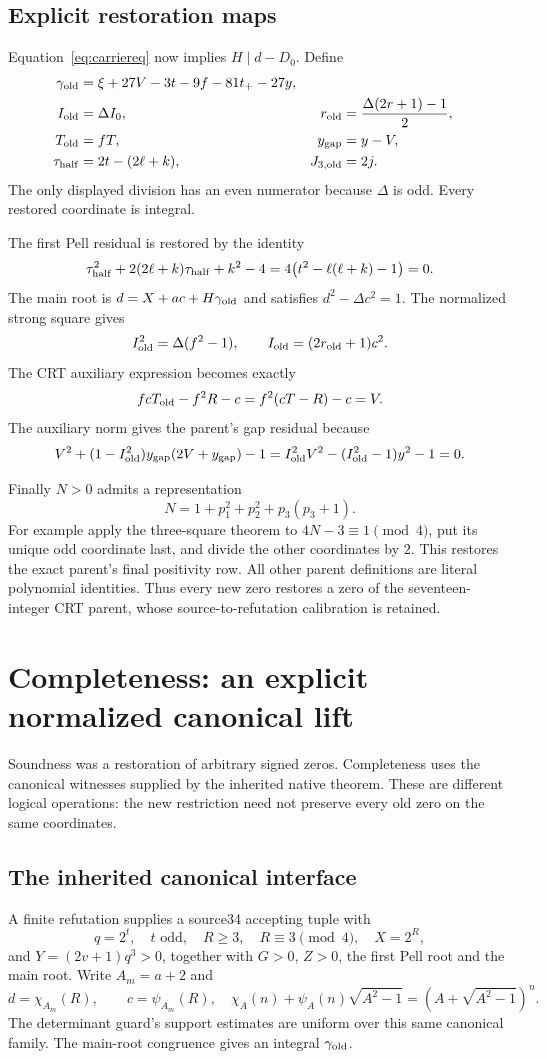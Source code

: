 \documentclass[11pt]{article}
\theoremstyle{remark}\newtheorem{remark}[theorem]{Remark}
\begin{document}
\subsection{Explicit restoration maps}
Equation~\eqref{eq:carriereq} now implies $H\mid d-D_0$. Define
\begin{align}
 \gamma_{\rm old}&=\xi+27V-3t-9f-81t_+-27y,\notag\\
 I_{\rm old}&=\Delta I_0,
 &r_{\rm old}&=\frac{\Delta(2r+1)-1}{2},\label{eq:restore}\\
 T_{\rm old}&=fT,
 &y_{\rm gap}&=y-V,\notag\\
 \tau_{\rm half}&=2t-(2\ell+k),
 &J_{3,\rm old}&=2j.\notag
\end{align}
The only displayed division has an even numerator because $\Delta$ is
odd. Every restored coordinate is integral.

The first Pell residual is restored by the identity
\[
 \tau_{\rm half}^2+2(2\ell+k)\tau_{\rm half}+k^2-4
 =4\bigl(t^2-\ell(\ell+k)-1\bigr)=0.
\]
The main root is $d=X+ac+H\gamma_{\rm old}$ and satisfies
$d^2-\Delta c^2=1$. The normalized strong square gives
\[
 I_{\rm old}^2=\Delta(f^2-1),\qquad
 I_{\rm old}=(2r_{\rm old}+1)c^2.
\]
The CRT auxiliary expression becomes exactly
\[
 fcT_{\rm old}-f^2R-c=f^2(cT-R)-c=V.
\]
The auxiliary norm gives the parent's gap residual because
\[
 V^2+(1-I_{\rm old}^2)y_{\rm gap}(2V+y_{\rm gap})-1
 =I_{\rm old}^2V^2-(I_{\rm old}^2-1)y^2-1=0.
\]

Finally $N>0$ admits a representation
\[
 N=1+p_1^2+p_2^2+p_3(p_3+1).
\]
For example apply the three-square theorem to $4N-3\equiv1\pmod4$,
put its unique odd coordinate last, and divide the other coordinates by
$2$. This restores the exact parent's final positivity row.
All other parent definitions are literal polynomial identities. Thus every
new zero restores a zero of the seventeen-integer CRT parent, whose
source-to-refutation calibration is retained.

\section{Completeness: an explicit normalized canonical lift}\label{sec:complete}
Soundness was a restoration of arbitrary signed zeros. Completeness uses
the canonical witnesses supplied by the inherited native theorem. These
are different logical operations: the new restriction need not preserve
every old zero on the same coordinates.

\subsection{The inherited canonical interface}
A finite refutation supplies a source34 accepting tuple with
\[
 q=2^t,\quad t\text{ odd},\quad R\ge3,\quad R\equiv3\pmod4,
 \quad X=2^R,
\]
and $Y=(2v+1)q^3>0$, together with $G>0$, $Z>0$, the first Pell
root and the main root. Write $A_m=a+2$ and
\[
 d=\chi_{A_m}(R),\qquad c=\psi_{A_m}(R),
 \quad\chi_A(n)+\psi_A(n)\sqrt{A^2-1}=(A+\sqrt{A^2-1})^n.
\]
The determinant guard's support estimates are uniform over this same
canonical family. The main-root congruence gives an integral
$\gamma_{\rm old}$.
\end{document}
